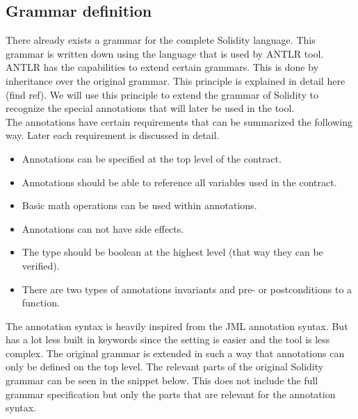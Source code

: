 \documentclass[a4paper]{article}
\begin{document}
\subsection{Grammar definition}
There already exists a grammar for the complete Solidity language. This grammar is written down using the language that is used by ANTLR tool. ANTLR has the capabilities to extend certain grammars. This is done by inheritance over the original grammar. This principle is explained in detail here (find ref). We will use this principle to extend the grammar of Solidity to recognize the special annotations that will later be used in the tool. \\
The annotations have certain requirements that can be summarized the following way. Later each requirement is discussed in detail.
\begin{itemize}
    \item Annotations can be specified at the top level of the contract.
    \item Annotations should be able to reference all variables used in the contract.
    \item Basic math operations can be used within annotations.
    \item Annotations can not have side effects.
    \item The type should be boolean at the highest level (that way they can be verified).
    \item There are two types of annotations invariants and pre- or postconditions to a function.
\end{itemize}

The annotation syntax is heavily inspired from the JML annotation syntax. But has a lot less built in keywords since the setting is easier and the tool is less complex. The original grammar is extended in such a way that annotations can only be defined on the top level. The relevant parts of the original Solidity grammar can be seen in the snippet below. This does not include the full grammar specification but only the parts that are relevant for the annotation syntax.
\end{document}
